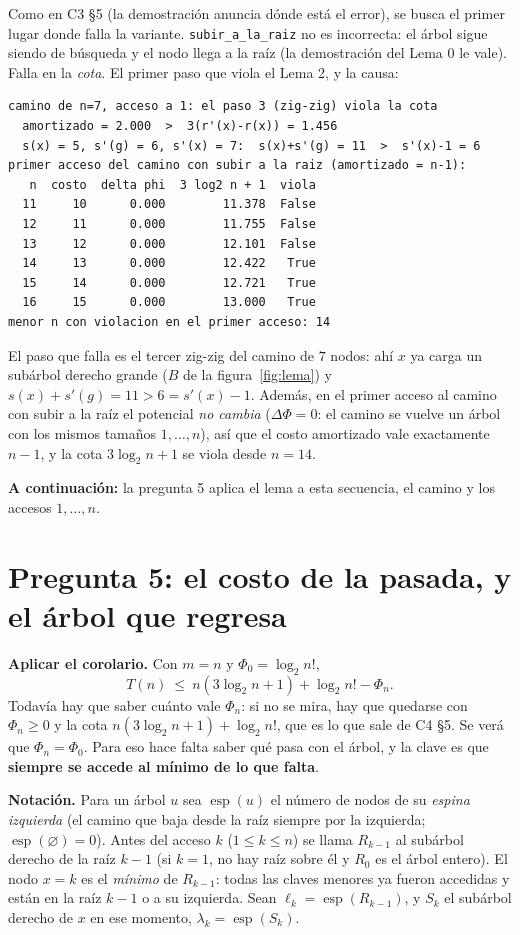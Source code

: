 \documentclass[11pt]{article}
\newcommand{\esp}{\operatorname{esp}}
\begin{document}
Como en C3 §5 (la demostración anuncia dónde está el error), se busca el primer lugar donde falla la variante. \texttt{subir\_a\_la\_raiz} no es incorrecta: el árbol sigue siendo de
búsqueda y el nodo llega a la raíz (la demostración del Lema 0 le vale). Falla en la \emph{cota}. El primer paso que viola el Lema 2, y la causa:
\begin{lstlisting}[style=salida,basicstyle=\ttfamily\footnotesize,columns=fixed]
camino de n=7, acceso a 1: el paso 3 (zig-zig) viola la cota
  amortizado = 2.000  >  3(r'(x)-r(x)) = 1.456
  s(x) = 5, s'(g) = 6, s'(x) = 7:  s(x)+s'(g) = 11  >  s'(x)-1 = 6
primer acceso del camino con subir a la raiz (amortizado = n-1):
   n  costo  delta phi  3 log2 n + 1  viola
  11     10      0.000        11.378  False
  12     11      0.000        11.755  False
  13     12      0.000        12.101  False
  14     13      0.000        12.422   True
  15     14      0.000        12.721   True
  16     15      0.000        13.000   True
menor n con violacion en el primer acceso: 14
\end{lstlisting}
El paso que falla es el tercer zig-zig del camino de $7$ nodos: ahí $x$ ya carga un subárbol derecho grande ($B$ de la figura~\ref{fig:lema}) y
$s(x)+s'(g)=11>6=s'(x)-1$. Además, en el primer acceso al camino con subir a la raíz el potencial \emph{no cambia} ($\Delta\Phi=0$: el camino se vuelve un árbol con los
mismos tamaños $1,\dots,n$), así que el costo amortizado vale exactamente $n-1$, y la cota $3\log_2n+1$ se viola desde $n=14$.

\textbf{A continuación:} la pregunta 5 aplica el lema a esta secuencia, el camino y los accesos $1,\dots,n$.

\section{Pregunta 5: el costo de la pasada, y el árbol que regresa}

\textbf{Aplicar el corolario.} Con $m=n$ y $\Phi_0=\log_2n!$,
\[
T(n)\ \le\ n(3\log_2n+1)+\log_2n!-\Phi_n .
\]
Todavía hay que saber cuánto vale $\Phi_n$: si no se mira, hay que quedarse con $\Phi_n\ge0$ y la cota
$n(3\log_2n+1)+\log_2n!$, que es lo que sale de C4 §5. Se verá que $\Phi_n=\Phi_0$. Para eso hace falta saber qué pasa
con el árbol, y la clave es que \textbf{siempre se accede al mínimo de lo que falta}.

\textbf{Notación.} Para un árbol $u$ sea $\esp(u)$ el número de nodos de su \emph{espina izquierda} (el camino que baja desde la raíz siempre por la
izquierda; $\esp(\varnothing)=0$). Antes del acceso $k$ ($1\le k\le n$) se llama $R_{k-1}$ al subárbol derecho de la raíz $k-1$ (si $k=1$, no hay
raíz sobre él y $R_0$ es el árbol entero). El nodo $x=k$ es el \emph{mínimo} de $R_{k-1}$: todas las claves menores ya fueron accedidas y están en la raíz
$k-1$ o a su izquierda. Sean $\ell_k=\esp(R_{k-1})$, y $S_k$ el subárbol derecho de $x$ en ese momento, $\lambda_k=\esp(S_k)$.
\end{document}
